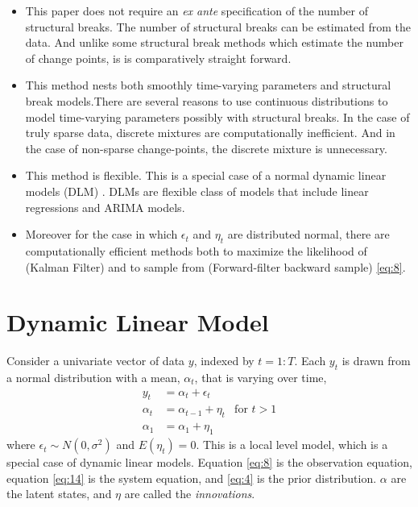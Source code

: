 \documentclass{article}
\begin{document}
\begin{itemize}
\item This paper does not require an \textit{ex ante} specification of
  the number of structural breaks. 
  The number of structural breaks can be estimated from the data.
  And unlike some structural break methods which estimate the number of change points, is is comparatively straight forward.
\item This method nests both smoothly time-varying parameters and
  structural break models.There are several reasons to use continuous
  distributions to model time-varying parameters possibly with
  structural breaks.  In the case of truly sparse data, discrete
  mixtures are computationally inefficient.  And in the case of
  non-sparse change-points, the discrete mixture is unnecessary.
\item This method is flexible.  This is a special case of a normal
  dynamic linear models
  (DLM) \parencites{WestHarrison1997}{DurbinKoopman2012}{CommandeurKoopman2007}{ShumwayStoffer2010}.
  DLMs are flexible class of models that include linear regressions
  and ARIMA models.
\item Moreover for the case in which $\epsilon_{t}$ and $\eta_{t}$ are distributed normal, there are computationally efficient methods both to maximize the likelihood of (Kalman Filter) and to sample from (Forward-filter backward sample) \eqref{eq:8}.
\end{itemize}

\section{Dynamic Linear Model}

Consider a univariate vector of data $y$, indexed by $t = 1:T$.
Each $y_{t}$ is drawn from a normal distribution with a mean, $\alpha_{t}$, that is varying over time,
\begin{align}
  \label{eq:8}
  y_t &= \alpha_t + \epsilon_t \\
  \label{eq:14}
  \alpha_t &= \alpha_{t-1} + \eta_{t} & \text{for $t > 1$} \\
  \label{eq:19}
  \alpha_1 &= \alpha_{1} + \eta_{1}
\end{align}
where $\epsilon_{t} \sim N(0, \sigma^{2})$ and $E(\eta_{t}) = 0$.
This is a local level model, which is a special case of dynamic linear models.
Equation \eqref{eq:8} is the observation equation, 
equation \eqref{eq:14} is the system equation,
and \eqref{eq:4} is the prior distribution.
$\alpha$ are the latent states, and $\eta$ are called the \textit{innovations}.
\end{document}
